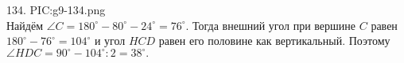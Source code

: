 134. {{PIC:g9-134.png}}\\
Найдём $\angle C=180^\circ-80^\circ-24^\circ=76^\circ.$ Тогда внешний угол при вершине $C$ равен $180^\circ-76^\circ=104^\circ$ и угол $HCD$ равен его половине как вертикальный. Поэтому $\angle HDC=90^\circ-104^\circ:2=38^\circ.$\newpage\noindent
